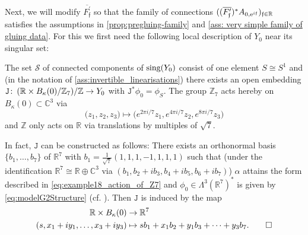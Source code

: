 \documentclass[11pt,a4paper]{scrartcl}
\newcommand{\col}{\colon \thinspace}
\newcommand{\e}{\textup{e}}
\numberwithin{equation}{section}
\theoremstyle{plain}
\theoremstyle{definition}
\theoremstyle{remark}
\begin{document}
Next, we will modify $\overline{F_{\mathfrak{f}}^\prime}$ so that the family of connections $((\overline{F_{\mathfrak{f}}^\prime})^*A_{0,\e^{i\mathfrak{f}}})_{\mathfrak{f}\in \mathbb{R}}$ satisfies the assumptions in \autoref{prop:pregluing-family} and \autoref{ass: very simple family of gluing data}. For this we first need the following local description of $Y_0$ near its singular set:

\begin{proposition}\label{prop:example18_description_of_singularset}
The set $\mathcal{S}$ of connected components of $\textup{sing}(Y_0)$ consist of one element $S \cong S^1$ and (in the notation of \autoref{ass:invertible_linearisations}) there exists an open embedding $\mathtt{J}\col (\mathbb{R} \times B_\kappa(0)/\mathbb{Z}_7)/\mathbb{Z} \to Y_0$ with $\mathtt{J}^*\phi_0 = \phi_{S}$. The group $\mathbb{Z}_7$ acts hereby on $B_\kappa(0)\subset \mathbb{C}^3$ via 
\begin{equation}\label{eq:example18_action_of_Z7}
\big(z_1,z_2,z_3\big) \mapsto \big(e^{2\pi i/7}z_1,e^{4\pi i/7}z_2,e^{8\pi i/7}z_3\big) 
\end{equation} 
and $\mathbb{Z}$ only acts on $\mathbb{R}$ via translations by multiples of $\sqrt{7}$.

In fact, $\mathtt{J}$ can be constructed as follows: There exists an orthonormal basis $\{b_1,\dots,b_7\}$ of $\mathbb{R}^7$ with $b_1 = \tfrac{1}{\sqrt{7}} (1,1,1,-1,1,1,1)$ such that (under the identification $\mathbb{R}^7 \cong \mathbb{R}\oplus \mathbb{C}^3$ via $(b_1,b_2+ib_3,b_4+ib_5,b_6+ib_7)$) $\alpha$ attains the form described in \eqref{eq:example18_action_of_Z7} and $\phi_0\in \Lambda^3(\mathbb{R}^7)^*$ is given by \eqref{eq:modelG2Structure} (cf. \cite[Theorem~8.1]{SalamonWalpuski-NotesOnOctonions}). Then $\mathtt{J}$ is induced by the map 
\begin{align*}
\mathbb{R} \times B_{\kappa}(0) &\to \mathbb{R}^7 \\
(s,x_1+iy_1,\dots,x_3+iy_3) &\mapsto s b_1 +x_1 b_2 + y_1 b_3+ \dots + y_3 b_7. \qedhere
\end{align*}
\end{proposition}
\end{document}
